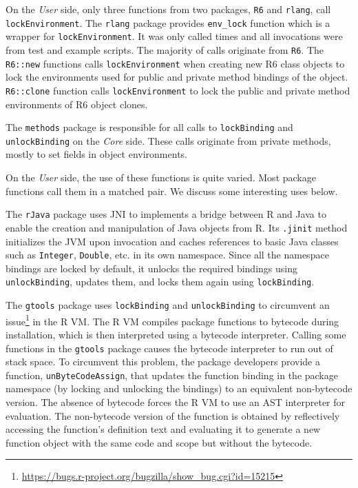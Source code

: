 \documentclass[10pt,review,sigplan,anonymous=true,authorversion=true,nonacm=true]{acmart}
\renewcommand{\c}[1]{\lstinline |#1|\xspace}
\begin{document}
On the \emph{User} side, only three functions from two packages, \c{R6} and
\c{rlang}, call \c{lockEnvironment}. The \c{rlang} package provides \c{env_lock}
function which is a wrapper for \c{lockEnvironment}. It was only called
\LockEnvironmentRlangCallCount times and all invocations were from test and
example scripts. The majority of calls originate from \c{R6}. The \c{R6::new}
functions calls \c{lockEnvironment} when creating new R6 class objects to lock
the environments used for public and private method bindings of the object.
\c{R6::clone} function calls \c{lockEnvironment} to lock the public and private
method environments of R6 object clones.

The \c{methods} package is responsible for all calls to \c{lockBinding} and
\c{unlockBinding} on the \emph{Core} side. These calls originate from private
methods, mostly to set fields in object environments.

On the \emph{User} side, the use of these functions is quite varied. Most
package functions call them in a matched pair. We discuss some interesting uses
below.

The \c{rJava} package uses JNI to implements a bridge between R and Java to
enable the creation and manipulation of Java objects from R. Its \c{.jinit}
method initializes the JVM upon invocation and caches references to basic Java
classes such as \c{Integer}, \c{Double}, etc. in its own namespace. Since all
the namespace bindings are locked by default, it unlocks the required bindings
using \c{unlockBinding}, updates them, and locks them again using
\c{lockBinding}.

The \c{gtools} package uses \c{lockBinding} and \c{unlockBinding} to circumvent
an
issue\footnote{\url{https://bugs.r-project.org/bugzilla/show_bug.cgi?id=15215}}
in the R VM. The R VM compiles package functions to bytecode during
installation, which is then interpreted using a bytecode interpreter. Calling
some functions in the \c{gtools} package causes the bytecode interpreter to run
out of stack space. To circumvent this problem, the package developers provide a
function, \c{unByteCodeAssign}, that updates the function binding in the package
namespace (by locking and unlocking the bindings) to an equivalent non-bytecode
version. The absence of bytecode forces the R VM to use an AST interpreter for
evaluation. The non-bytecode version of the function is obtained by reflectively
accessing the function's definition text and evaluating it to generate a new
function object with the same code and scope but without the bytecode.
\end{document}
